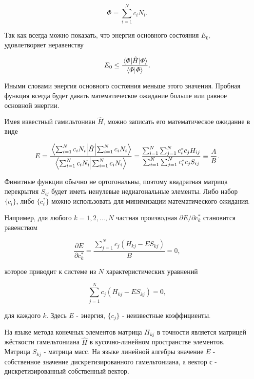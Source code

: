 \documentclass{article}
\begin{document}
\begin{displaymath}
	\varPhi = \sum_{i=1}^{N} c_{i} N_{i}.
\end{displaymath}

Так как всегда можно показать, что энергия основного состояния $E_{0}$, удовлетворяет неравенству

\begin{displaymath}
	E_{0} \leq \frac{\expval{\hat{H}}{\varPhi}}{\bra{\varPhi} \ket{\varPhi}}.
\end{displaymath}

Иными словами энергия основного состояния меньше этого значения. Пробная функция всегда будет давать математическое ожидание больше или равное основной энергии.

Имея известный гамильтониан $\hat{H}$, можно записать его математическое ожидание в виде

\begin{displaymath}
	E = \frac{\expval{\hat{H}}{\sum_{i=1}^{N} c_{i} N_{i}}}{\bra{\sum_{i=1}^{N} c_{i} N_{i}} \ket{\sum_{i=1}^{N} c_{i} N_{i}} } = \frac{\sum_{i=1}^{N} \sum_{j=1}^{N} c_{i}^{*} c_{j} H_{ij}}{\sum_{i=1}^{N} \sum_{j=1}^{N} c_{i}^{*} c_{j} S_{ij}} \equiv \frac{A}{B}.
\end{displaymath}

Финитные функции обычно не ортогональны, поэтому квадратная матрица перекрытия $S_{ij}$ будет иметь ненулевые недиагональные элементы. Либо набор $\{ c_{i} \}$, либо $\{ c_{i}^{*} \}$ можно использовать для минимизации математического ожидания.

Например, для любого $k = 1, 2, \dots, N$ частная производная $\partial E / \partial c_{k}^{*}$ становится равенством

\begin{displaymath}
	\frac{\partial E}{\partial c_{k}^{*}} = \frac{\sum_{j=1}^{N} c_{j} (H_{kj} - E S_{kj})}{B}= 0,
\end{displaymath}

\noindent которое приводит к системе из $N$ характеристических уравнений

\begin{displaymath}
	\sum_{j=1}^{N} c_{j} (H_{kj} - E S_{kj}) = 0,
\end{displaymath}

\noindent для каждого $k$. Здесь $E$ - энергия, $\{ c_{j} \}$ - неизвестные коэффициенты.

На языке метода конечных элементов матрица $H_{kj}$ в точности является матрицей жёсткости гамельтониана $\hat{H}$ в кусочно-линейном пространстве элементов.
Матрица $S_{kj}$ - матрица масс. На языке линейной алгебры значение $E$ - собственное значение дискретизированного гамельтониана, а вектор $с$ - дискретизированный собственный вектор.
\end{document}
